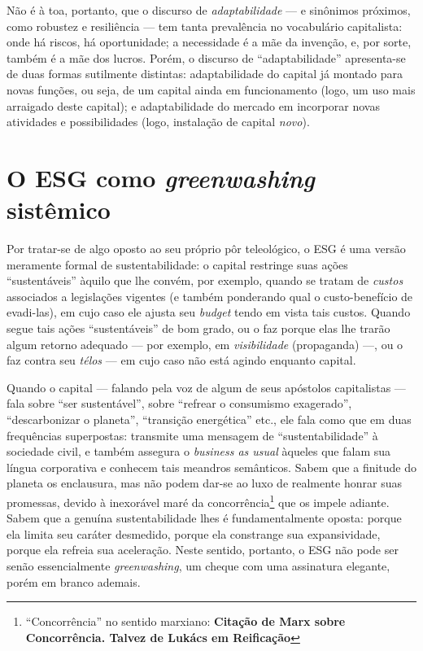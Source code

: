 \documentclass[12pt]{article}
\begin{document}
Não é à toa, portanto, que o discurso de \textit{adaptabilidade} --- e sinônimos próximos, como robustez e resiliência --- tem tanta prevalência no vocabulário capitalista: onde há riscos, há oportunidade; a necessidade é a mãe da invenção, e, por sorte, também é a mãe dos lucros. Porém, o discurso de ``adaptabilidade'' apresenta-se de duas formas sutilmente distintas: adaptabilidade do capital já montado para novas funções, ou seja, de um capital ainda em funcionamento (logo, um uso mais arraigado deste capital); e adaptabilidade do mercado em incorporar novas atividades e possibilidades (logo, instalação de capital \textit{novo}).




\section{O ESG como \textit{greenwashing} sistêmico}
Por tratar-se de algo oposto ao seu próprio pôr teleológico, o ESG é uma
versão meramente formal de sustentabilidade: o capital restringe suas
ações ``sustentáveis'' àquilo que lhe convém, por exemplo, quando se tratam de
\textit{custos} associados a legislações vigentes (e também ponderando
qual o custo-benefício de evadi-las), em cujo caso ele ajusta seu \textit{budget} tendo em vista tais custos. Quando segue tais ações ``sustentáveis'' de bom grado, ou o faz porque elas lhe trarão algum retorno adequado --- por exemplo, em \textit{visibilidade} (propaganda) ---, ou o faz contra seu \textit{télos} --- em cujo caso não está agindo enquanto capital.

Quando o capital --- falando pela voz de algum de seus apóstolos capitalistas --- fala sobre ``ser sustentável'', sobre ``refrear o consumismo exagerado'', ``descarbonizar o planeta'', ``transição energética'' etc., ele fala como que em duas frequências superpostas: transmite uma mensagem de ``sustentabilidade'' à sociedade civil, e também assegura o \textit{business as usual} àqueles que falam sua língua corporativa e conhecem tais meandros semânticos. Sabem que a finitude do planeta os enclausura, mas não podem dar-se ao luxo de realmente honrar suas promessas, devido à inexorável maré da concorrência\footnote{``Concorrência'' no sentido marxiano: \textbf{Citação de Marx sobre Concorrência. Talvez de Lukács em Reificação}} que os impele adiante. Sabem que a genuína sustentabilidade lhes é fundamentalmente oposta: porque ela limita seu caráter desmedido, porque ela constrange sua expansividade, porque ela refreia sua aceleração. Neste sentido, portanto, o ESG não pode ser senão essencialmente \textit{greenwashing}, um cheque com uma assinatura elegante, porém em branco ademais.
\end{document}

